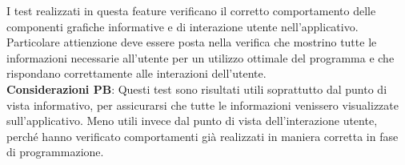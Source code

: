 \noindent I test realizzati in questa feature verificano il corretto comportamento delle componenti grafiche informative e di interazione utente nell'applicativo. Particolare attienzione deve essere posta nella verifica che mostrino tutte le informazioni necessarie all'utente per un utilizzo ottimale del programma e che rispondano correttamente alle interazioni dell'utente.
\vspace{0.2cm} \\ \textbf{Considerazioni PB}: Questi test sono risultati utili soprattutto dal punto di vista informativo, per assicurarsi che tutte le informazioni venissero visualizzate sull'applicativo. Meno utili invece dal punto di vista dell'interazione utente, perché hanno verificato comportamenti già realizzati in maniera corretta in fase di programmazione.


